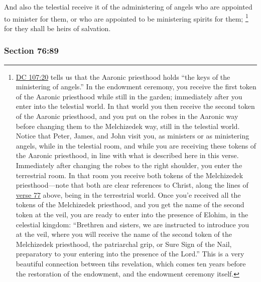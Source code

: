 		And also the telestial receive it of the administering of angels who are appointed to minister for them, or who are appointed to be ministering spirits for them;%
			\footnote{%
				\hyperref[DC107-20]{DC 107:20} tells us that the Aaronic priesthood holds ``the keys of the ministering of angels.'' In the endowment ceremony, you receive the first token of the Aaronic priesthood while still in the garden; immediately after you enter into the telestial world. In that world you then receive the second token of the Aaronic priesthood, and you put on the robes in the Aaronic way before changing them to the Melchizedek way, still in the telestial world. Notice that Peter, James, and John visit you, as ministers or as ministering angels, while in the telestial room, and while you are receiving these tokens of the Aaronic priesthood, in line with what is described here in this verse. Immediately after changing the robes to the right shoulder, you enter the terrestrial room. In that room you receive both tokens of the Melchizedek priesthood---note that both are clear references to Christ, along the lines of \hyperref[DC76-77]{verse 77} above, being in the terrestrial world. Once you'e received all the tokens of the Melchizedek priesthood, and you get the name of the second token at the veil, you are ready to enter into the presence of Elohim, in the celestial kingdom: ``Brethren and sisters, we are instructed to introduce you at the veil, where you will receive the name of the second token of the Melchizedek priesthood, the patriarchal grip, or Sure Sign of the Nail, preparatory to your entering into the presence of the Lord.'' This is a very beautiful connection between tihs revelation, which comes ten years before the restoration of the endowment, and the endowment ceremony itself. 
				}
		for they shall be heirs of salvation.


	\subsubsection{Section 76:89} %
		\label{DC76-89}

